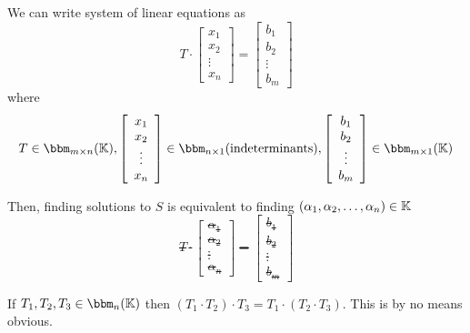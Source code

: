 \begin{observe}
    We can write system of linear equations as \[
        T \cdot \left[
            \begin{array}{c}
                x_1 \\ x_2 \\ \vdots \\ x_n
            \end{array}
            \right] = \left[
            \begin{array}{c}
                b_1 \\ b_2 \\ \vdots \\ b_m
            \end{array}
            \right]
    \] where \[
        T \in \bbm_{m\times n}(\bbk), \left[
            \begin{array}{c}
                x_1 \\ x_2 \\ \vdots \\ x_n
            \end{array}
            \right] \in \bbm_{n \times 1}(\text{indeterminants}), \left[
            \begin{array}{c}
                b_1 \\ b_2 \\ \vdots \\ b_m
            \end{array}
            \right] \in \bbm_{m \times 1}(\bbk)
    \]

    Then, finding solutions to \(S\) is equivalent to finding \((\alpha_1, \alpha_2, \dots, \alpha_n) \in \mathbb{K}\) \st \[T \cdot \left[
            \begin{array}{c}
                \alpha_1 \\ \alpha_2 \\ \vdots \\ \alpha_n
            \end{array}
            \right] = \left[
            \begin{array}{c}
                b_1 \\ b_2 \\ \vdots \\ b_m
            \end{array}
            \right]\]
\end{observe}

\begin{exercise}
    If \(T_1, T_2, T_3 \in \bbm_n(\bbk)\) then \((T_1 \cdot T_2) \cdot T_3 = T_1 \cdot (T_2 \cdot T_3)\). This is by no means obvious.
\end{exercise}

